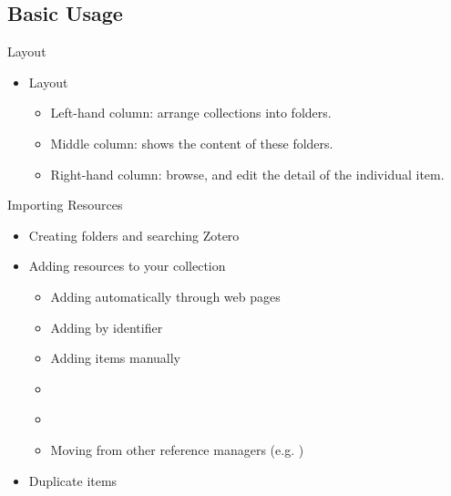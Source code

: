 \documentclass[UTF8]{beamer}
\begin{document}
\subsection{Basic Usage}

\begin{frame}{Layout}
\begin{itemize}
\item Layout
  \begin{itemize}
  \item Left-hand column: arrange collections into folders. 
  \item Middle column: shows the content of these folders.
  \item Right-hand column: browse, and edit the detail of the individual item.
  \end{itemize}
\end{itemize}
\end{frame}

\begin{frame}{Importing Resources}
\begin{itemize}
\item Creating folders and searching Zotero
 \item Adding resources to your collection
   \begin{itemize}
   \item Adding automatically through web pages 
   \item Adding by identifier
   \item Adding items manually
   \item \href{https://www.zotero.org/support/moving_to_zotero}{\textit{\color{blue}{Importing from other reference managers}}}
   \item \href{https://www.zotero.org/blog/scan-books-into-zotero-from-your-iphone-or-ipad/}{\textit{\color{blue}{Scan Books into Zotero from Your iPhone or iPad}}} 
   \item Moving from other reference managers (e.g. \href{https://libguides.nus.edu.sg/c.php?g=145733&p=1433183}{\color{blue}{Endnote}})
  \end{itemize}
\item Duplicate items
\end{itemize}
\end{frame}
\end{document}

